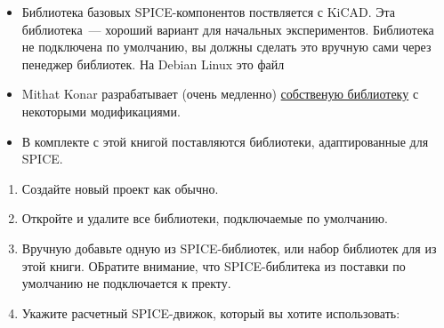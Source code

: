 
\secdown


\begin{itemize}
\item Библиотека базовых SPICE-компонентов поствляется с KiCAD. Эта
библиотека\ --- хороший вариант для начальных экспериментов.
Библиотека не подключена по умолчанию, вы должны сделать это вручную сами через
пенеджер библиотек. На Debian Linux это файл\\

\item Mithat Konar  разрабатывает (очень медленно)
\href{https://bitbucket.org/mithat/kicad-spice-library}{собственую
библиотеку} с некоторыми модификациями.

\item В комплекте с этой книгой поставляются библиотеки, адаптированные для
SPICE.

\end{itemize}


\begin{enumerate}
\item Создайте новый проект как обычно.
\item Откройте  и удалите все библиотеки, подключаемые по
умолчанию.
\item Вручную добавьте одную из SPICE-библиотек, или набор библиотек для
из этой книги. ОБратите внимание, что SPICE-библитека из поставки 
по умолчанию не подключается к пректу.
\item Укажите расчетный SPICE-движок, который вы хотите использовать:



\end{enumerate}


